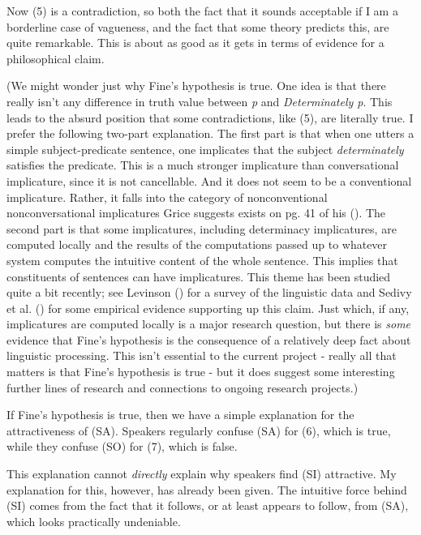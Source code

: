 \documentclass[
  11pt,
  letterpaper,
  DIV=11,
  numbers=noendperiod,
  twoside]{scrartcl}
\begin{document}
Now (5) is a contradiction, so both the fact that it sounds acceptable
if I am a borderline case of vagueness, and the fact that some theory
predicts this, are quite remarkable. This is about as good as it gets in
terms of evidence for a philosophical claim.

(We might wonder just why Fine's hypothesis is true. One idea is that
there really isn't any difference in truth value between \emph{p} and
\emph{Determinately p}. This leads to the absurd position that some
contradictions, like (5), are literally true. I prefer the following
two-part explanation. The first part is that when one utters a simple
subject-predicate sentence, one implicates that the subject
\emph{determinately} satisfies the predicate. This is a much stronger
implicature than conversational implicature, since it is not
cancellable. And it does not seem to be a conventional implicature.
Rather, it falls into the category of nonconventional nonconversational
implicatures Grice suggests exists on pg. 41 of his
(). The second part is that some
implicatures, including determinacy implicatures, are computed locally
and the results of the computations passed up to whatever system
computes the intuitive content of the whole sentence. This implies that
constituents of sentences can have implicatures. This theme has been
studied quite a bit recently; see Levinson
() for a survey of the linguistic data
and Sedivy et al. () for some empirical
evidence supporting up this claim. Just which, if any, implicatures are
computed locally is a major research question, but there is \emph{some}
evidence that Fine's hypothesis is the consequence of a relatively deep
fact about linguistic processing. This isn't essential to the current
project - really all that matters is that Fine's hypothesis is true -
but it does suggest some interesting further lines of research and
connections to ongoing research projects.)

If Fine's hypothesis is true, then we have a simple explanation for the
attractiveness of (SA). Speakers regularly confuse (SA) for (6), which
is true, while they confuse (SO) for (7), which is false.

This explanation cannot \emph{directly} explain why speakers find (SI)
attractive. My explanation for this, however, has already been given.
The intuitive force behind (SI) comes from the fact that it follows, or
at least appears to follow, from (SA), which looks practically
undeniable.
\end{document}
